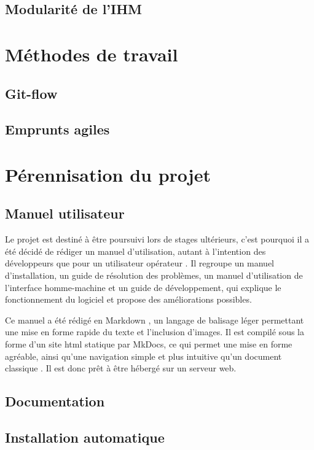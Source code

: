 			
		\subsection{Modularité de l'IHM}
		
			
	\section{Méthodes de travail}

		\subsection{Git-flow}
		
			
		\subsection{Emprunts agiles}
		
			

	\section{Pérennisation du projet}
	
		\subsection{Manuel utilisateur}
		
			Le projet est destiné à être poursuivi lors de stages ultérieurs, c'est pourquoi il a été décidé de rédiger un manuel d'utilisation, autant à l'intention des développeurs que pour un utilisateur \og opérateur \fg{}. Il regroupe un manuel d'installation, un guide de résolution des problèmes, un manuel d'utilisation de l'interface homme-machine et un guide de développement, qui explique le fonctionnement du logiciel et propose des améliorations possibles.
			\par
			Ce manuel a été rédigé en Markdown \cite{markdown}, un langage de balisage léger permettant une mise en forme rapide du texte et l'inclusion d'images. Il est compilé sous la forme d'un site html statique par MkDocs\cite{mkdocs}, ce qui permet une mise en forme agréable, ainsi qu'une navigation simple et plus intuitive qu'un document \og classique \fg{}. Il est donc prêt à être hébergé sur un serveur web.
			
		\subsection{Documentation}
		
			
		\subsection{Installation automatique}
		
				
